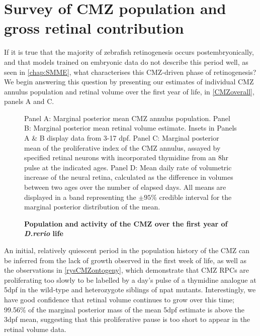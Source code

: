 \section{Survey of CMZ population and gross retinal contribution}

If it is true that the majority of zebrafish retinogenesis occurs postembryonically, and that models trained on embryonic data do not describe this period well, as seen in \autoref{chap:SMME}, what characterises this CMZ-driven phase of retinogenesis? We begin answering this question by presenting our estimates of individual CMZ annulus population and retinal volume over the first year of life, in \autoref{CMZoverall}, panels A and C.

\begin{figure}[!h]
    \caption{{\bf Population and activity of the CMZ over the first year of \textit{D.rerio} life}}
    Panel A: Marginal posterior mean CMZ annulus population. Panel B: Marginal posterior mean retinal volume estimate. Insets in Panels A \& B display data from 3-17 dpf. Panel C: Marginal posterior mean of the proliferative index of the CMZ annulus, assayed by specified retinal neurons with incorporated thymidine from an 8hr pulse at the indicated ages. Panel D: Mean daily rate of volumetric increase of the neural retina, calculated as the difference in volumes between two ages over the number of elapsed days. All means are displayed in a band representing the $\pm 95 \%$ credible interval for the marginal posterior distribution of the mean.
    \label{CMZoverall}
\end{figure}

An initial, relatively quiescent period in the population history of the CMZ can be inferred from the lack of growth observed in the first week of life, as well as the observations in \autoref{rysCMZontogeny}, which demonstrate that CMZ RPCs are proliferating too slowly to be labelled by a day's pulse of a thymidine analogue at 5dpf in the wild-type and heterozygote siblings of npat mutants. Interestingly, we have good confidence that retinal volume continues to grow over this time; 99.56\% of the marginal posterior mass of the mean 5dpf estimate is above the 3dpf mean, suggesting that this proliferative pause is too short to appear in the retinal volume data.

